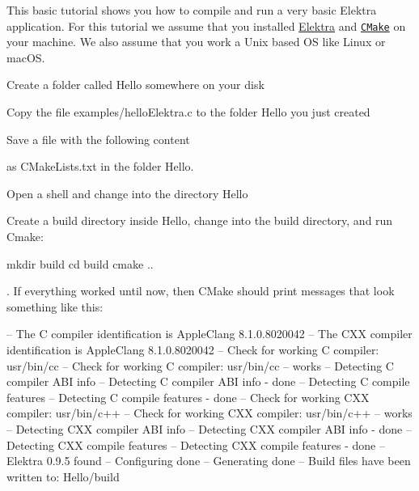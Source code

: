 This basic tutorial shows you how to compile and run a very basic Elektra application. For this tutorial we assume that you installed \hyperlink{doc_INSTALL_md}{Elektra} and \href{http://cmake.org}{\tt C\+Make} on your machine. We also assume that you work a Unix based OS like Linux or mac\+OS.


\begin{DoxyEnumerate}
\item Create a folder called {\ttfamily Hello} somewhere on your disk
\item Copy the file {\ttfamily examples/hello\+Elektra.\+c} to the folder {\ttfamily Hello} you just created
\item Save a file with the following content
\end{DoxyEnumerate}




as {\ttfamily C\+Make\+Lists.\+txt} in the folder {\ttfamily Hello}.


\begin{DoxyEnumerate}
\item Open a shell and change into the directory {\ttfamily Hello}
\item Create a build directory inside {\ttfamily Hello}, change into the build directory, and run Cmake\+:
\end{DoxyEnumerate}


\begin{DoxyCode}
mkdir build
cd build
cmake ..
\end{DoxyCode}


. If everything worked until now, then C\+Make should print messages that look something like this\+:


\begin{DoxyCode}
-- The C compiler identification is AppleClang 8.1.0.8020042
-- The CXX compiler identification is AppleClang 8.1.0.8020042
-- Check for working C compiler: usr/bin/cc
-- Check for working C compiler: usr/bin/cc -- works
-- Detecting C compiler ABI info
-- Detecting C compiler ABI info - done
-- Detecting C compile features
-- Detecting C compile features - done
-- Check for working CXX compiler: usr/bin/c++
-- Check for working CXX compiler: usr/bin/c++ -- works
-- Detecting CXX compiler ABI info
-- Detecting CXX compiler ABI info - done
-- Detecting CXX compile features
-- Detecting CXX compile features - done
-- Elektra 0.9.5 found
-- Configuring done
-- Generating done
-- Build files have been written to: Hello/build
\end{DoxyCode}



